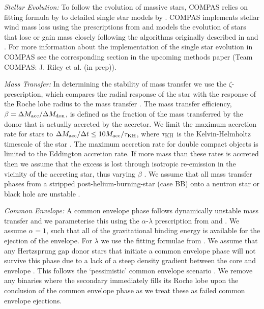 \textit{Stellar Evolution:} To follow the evolution of massive stars, COMPAS relies on fitting formula by \citet{Hurley+2000} to detailed single star models by \citet{Pols+1998}. COMPAS implements stellar wind mass loss using the prescriptions from \citet{Belczynski+2010b} and models the evolution of stars that lose or gain mass closely following the algorithms originally described in \citet{Tout+1996} and \citet{Hurley+2002}. For more information about the implementation of the single star evolution in COMPAS see the corresponding section in the upcoming methods paper (Team COMPAS: J. Riley et al. (in prep)).

\textit{Mass Transfer:} In determining the stability of mass transfer we use the $\zeta$-prescription, which compares the radial response of the star with the response of the Roche lobe radius to the mass transfer \citep[e.g.][]{Hjellming+1987}. The mass transfer efficiency, $\beta = \Delta M_{\rm acc} / \Delta M_{\rm don}$, is defined as the fraction of the mass transferred by the donor that is actually accreted by the accretor. We limit the maximum accretion rate for stars to $\Delta M_{\rm acc} / \Delta t \le 10 M_{\rm acc} / \tau_{\rm KH}$, where $\tau_{\rm KH}$ is the Kelvin-Helmholtz timescale of the star \citep{Paczynski+1972, Hurley+2002}. The maximum accretion rate for double compact objects is limited to the Eddington accretion rate. If more mass than these rates is accreted then we assume that the excess is lost through isotropic re-emission in the vicinity of the accreting star, thus varying $\beta$ \citep[e.g.][]{Massevitch+1975, Soberman+1997}. We assume that all mass transfer phases from a stripped post-helium-burning-star (case BB) onto a neutron star or black hole are unstable \citep{Tauris+2015}.

\textit{Common Envelope:} A common envelope phase follows dynamically unstable mass transfer and we parameterise this using the $\alpha$-$\lambda$ prescription from \citet{Webbink+1984} and \citet{deKool+1990}. We assume $\alpha = 1$, such that all of the gravitational binding energy is available for the ejection of the envelope. For $\lambda$ we use the fitting formulae from \citet{Xu+2010, Xu+2010a}. We assume that any Hertzsprung gap donor stars that initiate a common envelope phase will not survive this phase due to a lack of a steep density gradient between the core and envelope \citep{Taam+2000, Ivanova+2004}. This follows the `pessimistic' common envelope scenario \citep[c.f.][]{Belczynski+2007}. We remove any binaries where the secondary immediately fills its Roche lobe upon the conclusion of the common envelope phase as we treat these as failed common envelope ejections.


